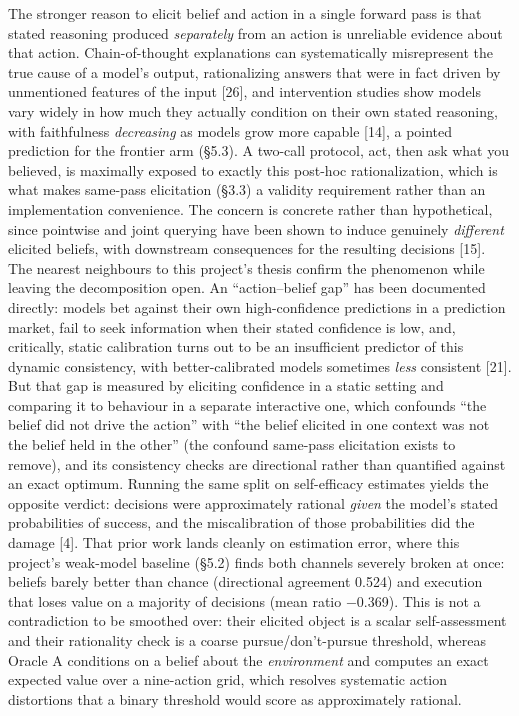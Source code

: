 \documentclass[
  11pt,
]{article}
\begin{document}
The stronger reason to elicit belief and action in a single forward pass is that stated reasoning produced \emph{separately} from an action is unreliable evidence about that action. Chain-of-thought explanations can systematically misrepresent the true cause of a model's output, rationalizing answers that were in fact driven by unmentioned features of the input {[}26{]}, and intervention studies show models vary widely in how much they actually condition on their own stated reasoning, with faithfulness \emph{decreasing} as models grow more capable {[}14{]}, a pointed prediction for the frontier arm (§5.3). A two-call protocol, act, then ask what you believed, is maximally exposed to exactly this post-hoc rationalization, which is what makes same-pass elicitation (§3.3) a validity requirement rather than an implementation convenience. The concern is concrete rather than hypothetical, since pointwise and joint querying have been shown to induce genuinely \emph{different} elicited beliefs, with downstream consequences for the resulting decisions {[}15{]}. The nearest neighbours to this project's thesis confirm the phenomenon while leaving the decomposition open. An ``action--belief gap'' has been documented directly: models bet against their own high-confidence predictions in a prediction market, fail to seek information when their stated confidence is low, and, critically, static calibration turns out to be an insufficient predictor of this dynamic consistency, with better-calibrated models sometimes \emph{less} consistent {[}21{]}. But that gap is measured by eliciting confidence in a static setting and comparing it to behaviour in a separate interactive one, which confounds ``the belief did not drive the action'' with ``the belief elicited in one context was not the belief held in the other'' (the confound same-pass elicitation exists to remove), and its consistency checks are directional rather than quantified against an exact optimum. Running the same split on self-efficacy estimates yields the opposite verdict: decisions were approximately rational \emph{given} the model's stated probabilities of success, and the miscalibration of those probabilities did the damage {[}4{]}. That prior work lands cleanly on estimation error, where this project's weak-model baseline (§5.2) finds both channels severely broken at once: beliefs barely better than chance (directional agreement 0.524) and execution that loses value on a majority of decisions (mean ratio −0.369). This is not a contradiction to be smoothed over: their elicited object is a scalar self-assessment and their rationality check is a coarse pursue/don't-pursue threshold, whereas Oracle A conditions on a belief about the \emph{environment} and computes an exact expected value over a nine-action grid, which resolves systematic action distortions that a binary threshold would score as approximately rational.
\end{document}
